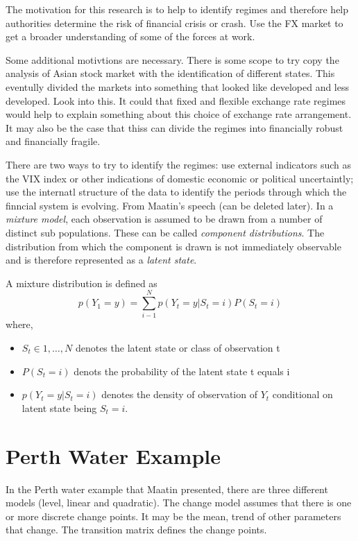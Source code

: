 \documentclass[12pt, a4paper, oneside]{article} %
\begin{document}
The motivation for this research is to help to identify regimes and therefore help authorities determine the risk of financial crisis or crash. Use the FX market to get a broader understanding of some of the forces at work.

Some additional motivtions are necessary. There is some scope to try copy the analysis of Asian stock market with the identification of different states.  This eventully divided the markets into something that looked like developed and less developed. Look into this.  It could that fixed and flexible exchange rate regimes would help to explain something about this choice of exchange rate arrangement.  It may also be the case that thiss can divide the regimes into financially robust and financially fragile. 

There are two ways to try to identify the regimes: use external indicators such as the VIX index or other indications of domestic economic or political uncertaintly; use the internatl structure of the data to identify the periods through which the finncial system  is evolving. 
From Maatin's speech (can be deleted later).  In a \emph{mixture model}, each observation is assumed to be drawn from a number of distinct sub populations.  These can be called \emph{component distributions}.  The distribution from which the component is drawn is not immediately observable and is therefore represented as a \emph{latent state}. 

A mixture distribution is defined as 
\begin{equation}
p(Y_1 = y) = \sum_{i - 1}^N p(Y_t = y|S_t = i)P(S_t = i)
\end{equation}
where,
\begin{itemize}
\item $S_t \in {1, \dots, N}$ denotes the latent state or class of observation t
\item $P(S_t = i)$ denots the probability of the latent state t equals i 
\item $p(Y_t = y|S_t = i)$ denotes the density of observation of $Y_t$ conditional on latent state being $S_t = i$.
\end{itemize}
\section{Perth Water Example}

In the Perth water example that Maatin presented, there are three different models (level, linear and quadratic).  The change model assumes that there is one or more discrete change points.  It may be the mean, trend of other parameters that change. The transition matrix defines the change points.  
\end{document}
